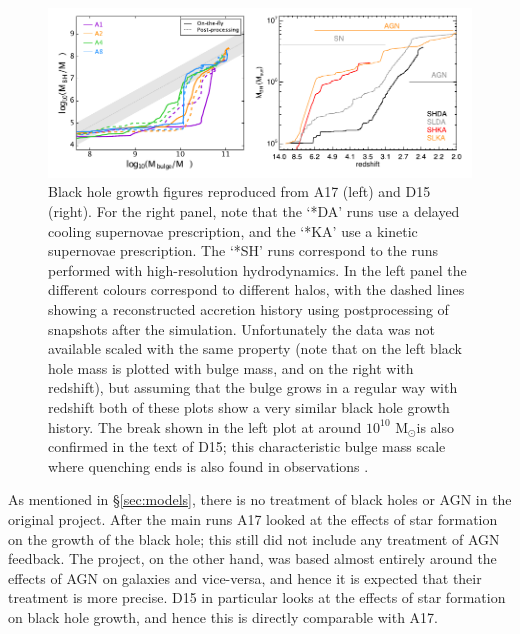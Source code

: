 \begin{figure}[!h]
  \includegraphics[width=\textwidth]{figures/comparisonfig.pdf}
    \caption{Black hole growth figures reproduced from A17 (left) and D15
    (right). For the right panel, note that the `*DA' runs use a delayed
    cooling supernovae prescription, and the `*KA' use a kinetic supernovae
    prescription. The `*SH' runs correspond to the runs performed with
    high-resolution hydrodynamics. In the left panel the different colours
    correspond to different halos, with the dashed lines showing a
    reconstructed accretion history using postprocessing of snapshots after the
    simulation. Unfortunately the data was not available scaled with the same
    property (note that on the left black hole mass is plotted with bulge mass,
    and on the right with redshift), but assuming that the bulge grows in a
    regular way with redshift both of these plots show a very similar black
    hole growth history. The break shown in the left plot at around $10^10$
    M$_\odot$is also confirmed in the text of D15; this characteristic bulge
    mass scale where quenching ends is also found in observations \citep[see
    e.g.][]{greene_precise_2010, graham_black_2015}.}
  \label{fig:bhhistory}
\end{figure}
As mentioned in §\ref{sec:models}, there is no treatment of black holes or AGN
in the original \fire{} project. After the main runs A17 looked at the effects
of star formation on the growth of the black hole; this still did not include
any treatment of AGN feedback. The \hagn{} project, on the other hand, was
based almost entirely around the effects of AGN on galaxies and vice-versa, and
hence it is expected that their treatment is more precise.  D15 in particular
looks at the effects of star formation on black hole growth, and hence this is
directly comparable with A17.

